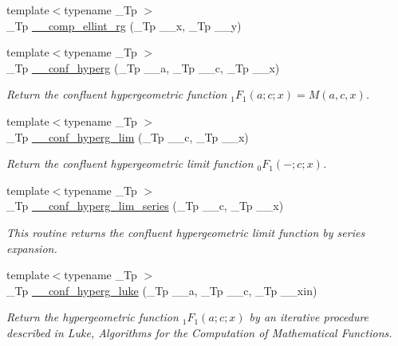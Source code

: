 \begin{DoxyCompactItemize}
\item 
{\footnotesize template$<$typename \+\_\+\+Tp $>$ }\\\+\_\+\+Tp \hyperlink{namespacestd_1_1____detail_a31bb5a6e359c88b5bece8dd73f76a2f9}{\+\_\+\+\_\+comp\+\_\+ellint\+\_\+rg} (\+\_\+\+Tp \+\_\+\+\_\+x, \+\_\+\+Tp \+\_\+\+\_\+y)
\item 
{\footnotesize template$<$typename \+\_\+\+Tp $>$ }\\\+\_\+\+Tp \hyperlink{namespacestd_1_1____detail_a3cb3151857e9ac01bc442c90301365ee}{\+\_\+\+\_\+conf\+\_\+hyperg} (\+\_\+\+Tp \+\_\+\+\_\+a, \+\_\+\+Tp \+\_\+\+\_\+c, \+\_\+\+Tp \+\_\+\+\_\+x)
\begin{DoxyCompactList}\small\item\em Return the confluent hypergeometric function $ {}_1F_1(a;c;x) = M(a,c,x) $. \end{DoxyCompactList}\item 
{\footnotesize template$<$typename \+\_\+\+Tp $>$ }\\\+\_\+\+Tp \hyperlink{namespacestd_1_1____detail_adc839c2b3faad5d78bf64236c5c7af73}{\+\_\+\+\_\+conf\+\_\+hyperg\+\_\+lim} (\+\_\+\+Tp \+\_\+\+\_\+c, \+\_\+\+Tp \+\_\+\+\_\+x)
\begin{DoxyCompactList}\small\item\em Return the confluent hypergeometric limit function $ {}_0F_1(-;c;x) $. \end{DoxyCompactList}\item 
{\footnotesize template$<$typename \+\_\+\+Tp $>$ }\\\+\_\+\+Tp \hyperlink{namespacestd_1_1____detail_a44b73ec79e0a8cfd1f29a21cb39f2bdc}{\+\_\+\+\_\+conf\+\_\+hyperg\+\_\+lim\+\_\+series} (\+\_\+\+Tp \+\_\+\+\_\+c, \+\_\+\+Tp \+\_\+\+\_\+x)
\begin{DoxyCompactList}\small\item\em This routine returns the confluent hypergeometric limit function by series expansion. \end{DoxyCompactList}\item 
{\footnotesize template$<$typename \+\_\+\+Tp $>$ }\\\+\_\+\+Tp \hyperlink{namespacestd_1_1____detail_ac3b4c72998f9d7deb6d79bda93220e58}{\+\_\+\+\_\+conf\+\_\+hyperg\+\_\+luke} (\+\_\+\+Tp \+\_\+\+\_\+a, \+\_\+\+Tp \+\_\+\+\_\+c, \+\_\+\+Tp \+\_\+\+\_\+xin)
\begin{DoxyCompactList}\small\item\em Return the hypergeometric function $ {}_1F_1(a;c;x) $ by an iterative procedure described in Luke, Algorithms for the Computation of Mathematical Functions. \end{DoxyCompactList}\item 

\end{DoxyCompactItemize}
